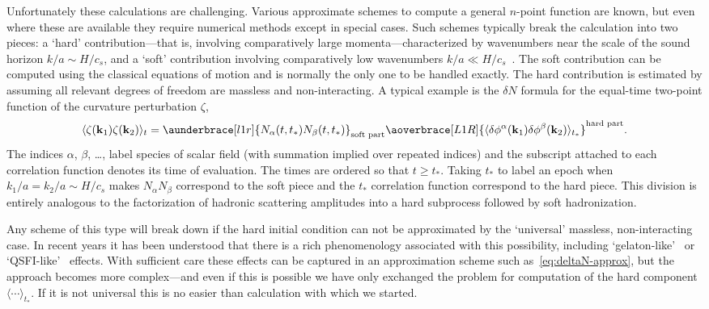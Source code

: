 \documentclass[11pt,a4paper]{article}
\newcommand{\vect}[1]{\bm{\mathrm{{#1}}}}
\renewcommand{\geq}{\geqslant}
\begin{document}
Unfortunately these calculations are challenging.
Various
approximate schemes to compute a general $n$-point function are known,
but even where these are available they require numerical methods
except in special cases.
Such schemes typically break the calculation into two pieces:
a `hard' contribution---that is, involving comparatively
large momenta---characterized by wavenumbers near the scale
of the sound horizon $k/a \sim H / c_s$,
and a `soft' contribution involving comparatively low wavenumbers
$k/a \ll H / c_s$~\cite{Dias:2012qy}.
The soft contribution can be computed using the classical
equations of motion and is normally the only one to be handled exactly.
The hard contribution is estimated by assuming
all relevant degrees of freedom are massless and non-interacting.
A typical example is the $\delta N$ formula for the
equal-time two-point function
of the curvature perturbation $\zeta$,
\begin{equation}
    \langle \zeta(\vect{k}_1) \zeta(\vect{k}_2) \rangle_t
    = \aunderbrace[l1r]{N_\alpha(t, t_\ast) N_\beta(t, t_\ast)}_{\text{soft part}}
    \aoverbrace[L1R]{\langle \delta\phi^\alpha(\vect{k}_1) \delta\phi^\beta(\vect{k}_2) \rangle_{t_\ast}}^{\text{hard part}} .
    \label{eq:deltaN-approx}
\end{equation}
The indices $\alpha$, $\beta$, \ldots, label species of scalar
field (with summation implied over repeated indices)
and the subscript attached to each correlation function
denotes its time of evaluation.
The times are ordered so that $t \geq t_\ast$.
Taking $t_\ast$ to label an epoch when
$k_1 / a = k_2 / a \sim H / c_s$
makes $N_\alpha N_\beta$
correspond to the soft piece
and the $t_\ast$ correlation function
correspond to the hard piece.
This division is entirely analogous to the factorization
of hadronic scattering amplitudes into a hard subprocess
followed by soft hadronization.

Any scheme of this type will break down if the
hard initial condition
can not be approximated by the `universal'
massless, non-interacting case.
In recent years it has been understood that there is
a rich phenomenology associated with this possibility,
including `gelaton-like'~\cite{Tolley:2009fg}
or
`QSFI-like'~\cite{Chen:2009we,Chen:2009zp,Chen:2012ge}
effects.
With sufficient care these effects can be captured
in an approximation scheme such as~\eqref{eq:deltaN-approx},
but the approach becomes more complex---and
even if this is possible we have only exchanged the problem
for computation of the hard
component
$\langle \cdots \rangle_{t_\ast}$.
If it is not universal
this is
no easier than
calculation with which we started.
\end{document}
